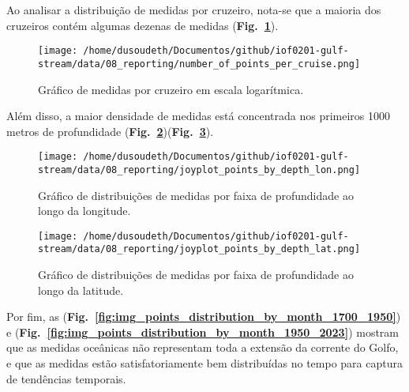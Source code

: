 \documentclass[journal]{IEEEtran}
\newcommand{\figref}[1]{(\textbf{Fig.~\ref{#1}})}
\begin{document}
            Ao analisar a distribuição de medidas por cruzeiro, nota-se que a maioria dos cruzeiros contém algumas dezenas de medidas \figref{fig:img_number_of_points_per_cruise}. 
            \begin{figure}[ht]
                \centering
                \texttt{[image: /home/dusoudeth/Documentos/github/iof0201-gulf-stream/data/08\_reporting/number\_of\_points\_per\_cruise.png]}
                \caption{Gráfico de medidas por cruzeiro em escala logarítmica.}
                \label{fig:img_number_of_points_per_cruise}
            \end{figure}
            Além disso, a maior densidade de medidas está concentrada nos primeiros 1000 metros de profundidade \figref{fig:img_joyplot_points_by_depth_lon}\figref{fig:img_joyplot_points_by_depth_lat}.
            \begin{figure}[ht]
                \centering
                \texttt{[image: /home/dusoudeth/Documentos/github/iof0201-gulf-stream/data/08\_reporting/joyplot\_points\_by\_depth\_lon.png]}
                \caption{Gráfico de distribuições de medidas por faixa de profundidade ao longo da longitude.}
                \label{fig:img_joyplot_points_by_depth_lon}
            \end{figure}
            \begin{figure}[ht]
                \centering
                \texttt{[image: /home/dusoudeth/Documentos/github/iof0201-gulf-stream/data/08\_reporting/joyplot\_points\_by\_depth\_lat.png]}
                \caption{Gráfico de distribuições de medidas por faixa de profundidade ao longo da latitude.}
                \label{fig:img_joyplot_points_by_depth_lat}
            \end{figure}
            Por fim, as \figref{fig:img_points_distribution_by_month_1700_1950} e \figref{fig:img_points_distribution_by_month_1950_2023} mostram que as medidas oceânicas não representam toda a extensão da corrente do Golfo, e que as medidas estão satisfatoriamente bem distribuídas no tempo para captura de tendências temporais.
\end{document}
